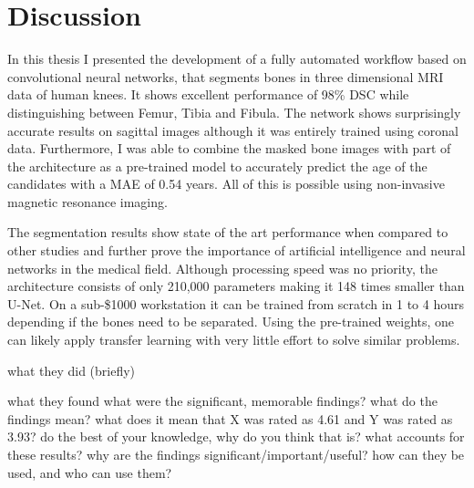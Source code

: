 \section{Discussion}

In this thesis I presented the development of a fully automated workflow based on convolutional neural networks, that segments bones in three dimensional MRI data of human knees. It shows excellent performance of 98\% DSC while distinguishing between Femur, Tibia and Fibula. The network shows surprisingly accurate results on sagittal images although it was entirely trained using coronal data. Furthermore, I was able to combine the masked bone images with part of the architecture as a pre-trained model to accurately predict the age of the candidates with a MAE of 0.54 years. All of this is possible using non-invasive magnetic resonance imaging.

The segmentation results show state of the art performance when compared to other studies and further prove the importance of artificial intelligence and neural networks in the medical field. Although processing speed was no priority, the architecture consists of only 210,000 parameters making it 148 times smaller than U-Net. On a sub-\$1000 workstation it can be trained from scratch in 1 to 4 hours depending if the bones need to be separated. Using the pre-trained weights, one can likely apply transfer learning with very little effort to solve similar problems.


what they did (briefly)

what they found
what were the significant, memorable findings?
what do the findings mean?
what does it mean that X was rated as 4.61 and Y was rated as 3.93?
do the best of your knowledge, why do you think that is? what accounts for these results?
why are the findings significant/important/useful? how can they be used, and who can use them?

\newpage